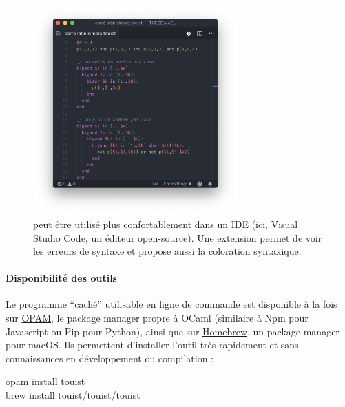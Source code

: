 \begin{figure}[!ht] \centering
  \includegraphics[width=0.7\textwidth]{figures/vscode-touist}
  \caption{\touist peut être utilisé plus confortablement dans un IDE (ici, Visual Studio Code, un éditeur open-source). Une extension permet de voir les erreurs de syntaxe et propose aussi la coloration syntaxique.} \label{fig:touist-vscode}
\end{figure}

\paragraph{Disponibilité des outils}

Le programme \enquote{caché} utilisable en ligne de commande est disponible à la fois sur \href{https://opam.ocaml.org/packages/touist}{OPAM}, le package manager propre à OCaml (similaire à Npm pour Javascript ou Pip pour Python), ainsi que sur \href{https://github.com/touist/homebrew-touist}{Homebrew}, un package manager pour macOS. Ils permettent d'installer l'outil très rapidement et sans connaissances en développement ou compilation :

\begin{mdpre}
    opam install touist\\
    brew install touist/touist/touist
\end{mdpre}